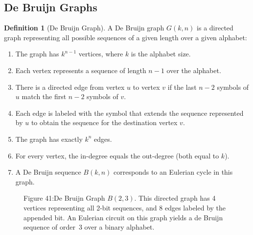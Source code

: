 \documentclass{article}
\theoremstyle{definition}
\newtheorem{definition}{Definition}
\begin{document}
\subsection{De Bruijn Graphs}
\begin{definition}[De Bruijn Graph]
A De Bruijn graph $G(k,n)$ is a directed graph representing all possible sequences of a given length over a given alphabet:

\begin{enumerate}
    \item The graph has $k^{n-1}$ vertices, where $k$ is the alphabet size.
    \item Each vertex represents a sequence of length $n-1$ over the alphabet.
    \item There is a directed edge from vertex $u$ to vertex $v$ if the last $n-2$ symbols of $u$ match the first $n-2$ symbols of $v$.
    \item Each edge is labeled with the symbol that extends the sequence represented by $u$ to obtain the sequence for the destination vertex $v$.
    \item The graph has exactly $k^n$ edges.
    \item For every vertex, the in-degree equals the out-degree (both equal to $k$).
    \item A De Bruijn sequence $B(k,n)$ corresponds to an Eulerian cycle in this graph.
\end{enumerate}
\end{definition}

\begin{figure}[ht]
  \centering

  {\centering
\small Figure 41:De Bruijn Graph $B(2,3)$. This directed graph has 4 vertices representing all 2-bit sequences, and 8 edges labeled by the appended bit. An Eulerian circuit on this graph yields a de Bruijn sequence of order~3 over a binary alphabet. \par}
\end{figure}
\end{document}
